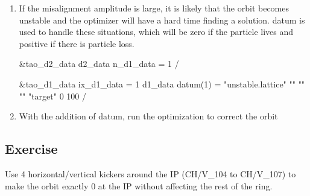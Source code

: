 \documentclass{hitec}     %
\begin{document}
{{{{\begin{enumerate}[leftmargin=*]
\item If the misalignment amplitude is large, it is likely that the orbit becomes unstable and the optimizer will have a hard time finding a solution.  datum is used to handle these situations, which will be zero if the particle lives and positive if there is particle loss. 
\begin{code}
&tao_d2_data
  	d2_data%
  	n_d1_data = 1
/

&tao_d1_data
	ix_d1_data = 1
	d1_data%
	datum(1) = "unstable.lattice" "" "" "" "target" 0 100
/
\end{code}

\item With the addition of  datum, run the optimization to correct the orbit
\end{enumerate}


\subsection{Exercise}
Use 4 horizontal/vertical kickers around the IP (CH/V_104 to CH/V_107) to make the orbit exactly 0 at the IP without affecting the rest of the ring.

\newpage







}}}}
\end{document}
